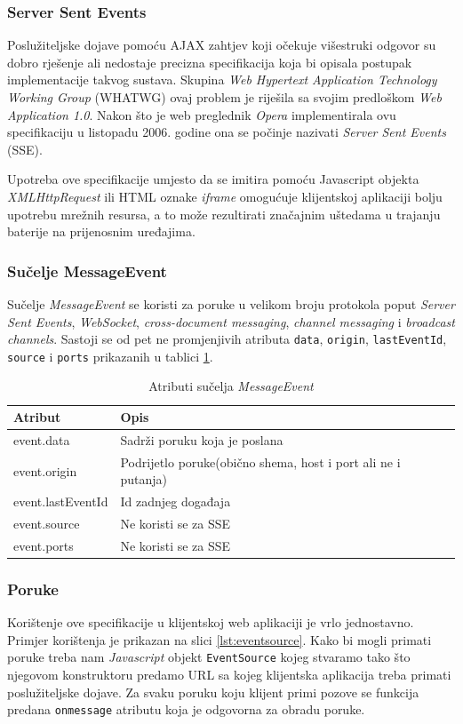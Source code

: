 \documentclass[times, utf8, zavrsni]{fer}
\begin{document}
\subsubsection{Server Sent Events}

Poslužiteljske dojave pomoću AJAX zahtjev koji očekuje višestruki odgovor su dobro rješenje ali nedostaje precizna specifikacija koja bi opisala postupak implementacije takvog sustava. Skupina {\em Web Hypertext Application Technology Working Group} (WHATWG) ovaj problem je riješila sa svojim predloškom {\em Web Application 1.0}. Nakon što je web preglednik {\em Opera} implementirala ovu specifikaciju u listopadu 2006. godine ona se počinje nazivati {\em Server Sent Events} (SSE).

Upotreba ove specifikacije umjesto da se imitira pomoću Javascript objekta {\em XMLHttpRequest} ili HTML oznake {\em iframe} omogućuje klijentskoj aplikaciji bolju upotrebu mrežnih resursa, a to može rezultirati značajnim uštedama u trajanju baterije na prijenosnim uređajima.

\subsubsection{Sučelje MessageEvent}
Sučelje {\em MessageEvent} se koristi za poruke u velikom broju protokola poput {\em Server Sent Events}, {\em WebSocket}, {\em cross-document messaging}, {\em channel messaging} i {\em broadcast channels}. Sastoji se od pet ne promjenjivih atributa {\tt data}, {\tt origin}, {\tt lastEventId}, {\tt source} i {\tt ports} prikazanih u tablici \ref{tbl:messageevent}.

\begin{table}[htb]
\caption{Atributi sučelja {\em MessageEvent}}
\label{tbl:messageevent}
\centering
\begin{tabular}{lll} \hline
Atribut & Opis \\ \hline
event.data & Sadrži poruku koja je poslana\\
event.origin & Podrijetlo poruke(obično shema, host i port ali ne i putanja)\\
event.lastEventId & Id zadnjeg događaja\\
event.source & Ne koristi se za SSE\\
event.ports & Ne koristi se za SSE\\
\end{tabular}
\end{table}

\subsubsection{Poruke}
Korištenje ove specifikacije u klijentskoj web aplikaciji je vrlo jednostavno. Primjer korištenja je prikazan na slici \ref{lst:eventsource}. Kako bi mogli primati poruke treba nam {\em Javascript} objekt {\tt EventSource} kojeg stvaramo tako što njegovom konstruktoru predamo URL sa kojeg klijentska aplikacija treba primati poslužiteljske dojave. Za svaku poruku koju klijent primi pozove se funkcija predana {\tt onmessage} atributu koja je odgovorna za obradu poruke.
\end{document}
